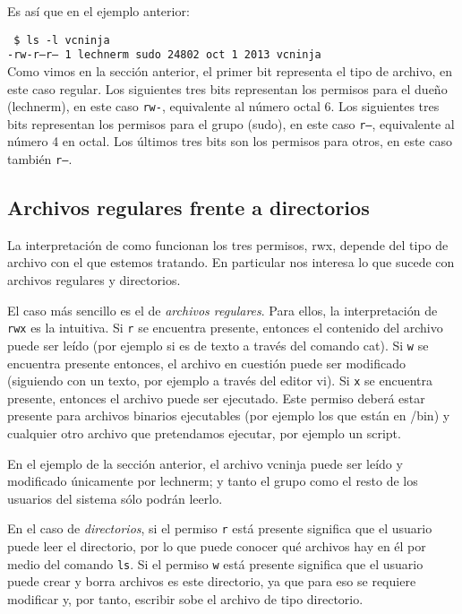 \documentclass[12pt]{article}
\begin{document}
Es así que en el ejemplo anterior: 

\texttt{
\$ ls -l vcninja \\
-rw-r--r-- 1 lechnerm sudo 24802 oct  1  2013 vcninja \\
}
Como vimos en la sección anterior, el primer bit representa el tipo de archivo, en este caso regular. Los 
siguientes tres bits representan los permisos para el dueño (lechnerm), en este 
caso \texttt{rw-}, equivalente al número octal 6. Los siguientes tres
bits representan los permisos para el grupo (sudo), en este caso {\tt r--}, 
equivalente al número 4 en octal. Los últimos tres bits son los 
permisos para otros, en este caso también {\tt r--}. 

\subsection*{Archivos regulares frente a directorios}

La interpretación de como funcionan los tres permisos, rwx, depende del 
tipo de archivo con el que estemos tratando. En particular nos interesa
lo que sucede con archivos regulares y directorios. 

El caso más sencillo es el de {\it archivos regulares}. Para ellos, la interpretación 
de {\tt rwx} es la intuitiva. Si {\tt r} se encuentra presente, entonces el contenido del archivo
puede ser leído (por ejemplo si es de texto a través del comando cat). Si {\tt w}
se encuentra presente entonces, el archivo en cuestión puede ser modificado 
(siguiendo con un texto, por ejemplo a través del editor vi). Si {\tt x} se encuentra
presente, entonces el archivo puede ser ejecutado. Este permiso deberá estar 
presente para archivos binarios ejecutables (por ejemplo los que están en /bin) y
cualquier otro archivo que pretendamos ejecutar, por ejemplo un script. 

En el ejemplo de la sección anterior, el archivo vcninja puede ser leído y 
modificado únicamente por lechnerm; y tanto el grupo como el resto de los 
usuarios del sistema sólo podrán leerlo. 

En el caso de {\it directorios}, si el permiso {\tt r} está presente
significa que el usuario puede leer el directorio, por lo que puede 
conocer qué archivos hay en él por medio del comando {\tt ls}. Si 
el permiso {\tt w} está presente significa que el usuario puede crear y 
borra archivos es este directorio, ya que para eso se requiere modificar y, 
por tanto, escribir sobe el archivo de tipo directorio.
\end{document}

